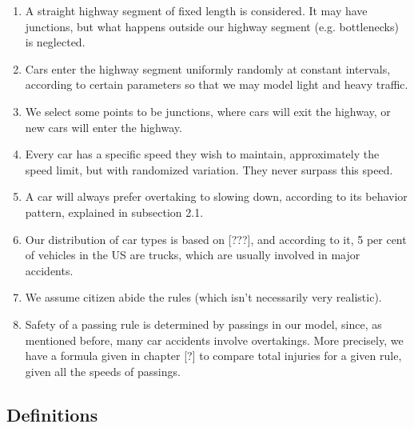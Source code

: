 \documentclass[12pt]{article}
\begin{document}
\begin{enumerate}
\item A straight highway segment of fixed length is considered. It may have junctions, but what happens outside our highway segment (e.g. bottlenecks) is neglected.

\item Cars enter the highway segment uniformly randomly at constant intervals, according to certain parameters so that we may model light and heavy traffic.

\item We select some points to be junctions, where cars will exit the highway, or new cars will enter the highway.

\item Every car has a specific speed they wish to maintain, approximately the speed limit, but with randomized variation. They never surpass this speed.

\item A car will always prefer overtaking to slowing down, according to its behavior pattern, explained in subsection 2.1.

\item Our distribution of car types is based on [???], and according to it, 5 per cent of vehicles in the US are trucks, which are usually involved in major accidents. 

\item We assume citizen abide the rules  (which isn't necessarily very realistic).

\item Safety of a passing rule is determined by passings in our model, since, as mentioned before, many car accidents involve overtakings. More precisely, we have a formula given in chapter [?] to compare total injuries for a given rule, given all the speeds of passings.




\end{enumerate}

\newpage

\subsection{Definitions}
\end{document}
